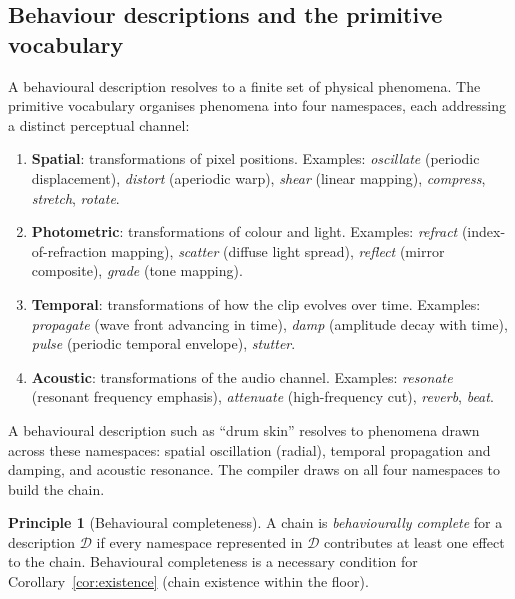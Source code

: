 \documentclass[twocolumn,11pt,a4paper]{article}
\theoremstyle{mee}
\theoremstyle{definition}
\newtheorem{principle}[theorem]{Principle}
\theoremstyle{remark}
\newcommand{\Desc}{\mathcal{D}}
\begin{document}
\subsection{Behaviour descriptions and the primitive vocabulary}

A behavioural description resolves to a finite set of physical phenomena.
The primitive vocabulary organises phenomena into four namespaces, each
addressing a distinct perceptual channel:

\begin{enumerate}[leftmargin=1.4em,itemsep=2pt]
\item \textbf{Spatial}: transformations of pixel positions.
  Examples: \textit{oscillate} (periodic displacement),
  \textit{distort} (aperiodic warp), \textit{shear} (linear mapping),
  \textit{compress}, \textit{stretch}, \textit{rotate}.
\item \textbf{Photometric}: transformations of colour and light.
  Examples: \textit{refract} (index-of-refraction mapping),
  \textit{scatter} (diffuse light spread), \textit{reflect} (mirror
  composite), \textit{grade} (tone mapping).
\item \textbf{Temporal}: transformations of how the clip evolves over
  time. Examples: \textit{propagate} (wave front advancing in time),
  \textit{damp} (amplitude decay with time), \textit{pulse}
  (periodic temporal envelope), \textit{stutter}.
\item \textbf{Acoustic}: transformations of the audio channel.
  Examples: \textit{resonate} (resonant frequency emphasis),
  \textit{attenuate} (high-frequency cut), \textit{reverb}, \textit{beat}.
\end{enumerate}

A behavioural description such as ``drum skin'' resolves to phenomena
drawn across these namespaces: spatial oscillation (radial), temporal
propagation and damping, and acoustic resonance. The compiler draws on all
four namespaces to build the chain.

\begin{principle}[Behavioural completeness]
\label{prin:completeness}
A chain is \emph{behaviourally complete} for a description $\Desc$ if
every namespace represented in $\Desc$ contributes at least one effect to
the chain. Behavioural completeness is a necessary condition for
Corollary~\ref{cor:existence} (chain existence within the floor).
\end{principle}

\end{document}

